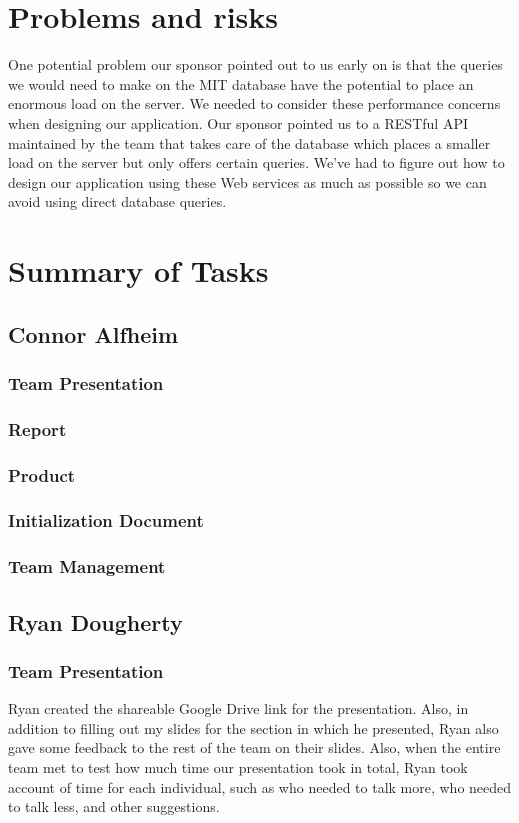 \documentclass[12pt]{article}
\begin{document}
\begin{spacing}{1.5}
\section{Problems and risks}
One potential problem our sponsor pointed out to us early on is that the queries we would need to make on the MIT database have the potential to place an enormous load on the server. We needed to consider these performance concerns when designing our application. Our sponsor pointed us to a RESTful API maintained by the team that takes care of the database which places a smaller load on the server but only offers certain queries. We've had to figure out how to design our application using these Web services as much as possible so we can avoid using direct database queries.
\section{Summary of Tasks}

\subsection{Connor Alfheim}
\subsubsection{Team Presentation}
\subsubsection{Report}
\subsubsection{Product}
\subsubsection{Initialization Document}
\subsubsection{Team Management}

\clearpage

\subsection{Ryan Dougherty}
\subsubsection{Team Presentation}
Ryan created the shareable Google Drive link for the presentation. Also, in addition to filling out my slides for the section in which he presented, Ryan also gave some feedback to the rest of the team on their slides. Also, when the entire team met to test how much time our presentation took in total, Ryan took account of time for each individual, such as who needed to talk more, who needed to talk less, and other suggestions.

\end{spacing}
\end{document}

